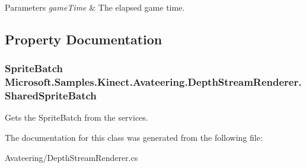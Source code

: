 \begin{DoxyParams}{Parameters}
{\em game\+Time} & The elapsed game time.\\
\hline
\end{DoxyParams}


\subsection{Property Documentation}
\hypertarget{class_microsoft_1_1_samples_1_1_kinect_1_1_avateering_1_1_depth_stream_renderer_aceaaf8ce615e328934f79619de246878}{
\subsubsection[{Shared\+Sprite\+Batch}]{\setlength{\rightskip}{0pt plus 5cm}Sprite\+Batch Microsoft.\+Samples.\+Kinect.\+Avateering.\+Depth\+Stream\+Renderer.\+Shared\+Sprite\+Batch\hspace{0.3cm}{\ttfamily [get]}}}\label{class_microsoft_1_1_samples_1_1_kinect_1_1_avateering_1_1_depth_stream_renderer_aceaaf8ce615e328934f79619de246878}


Gets the Sprite\+Batch from the services. 



The documentation for this class was generated from the following file\+:\begin{DoxyCompactItemize}
\item 
Avateering/Depth\+Stream\+Renderer.\+cs\end{DoxyCompactItemize}
